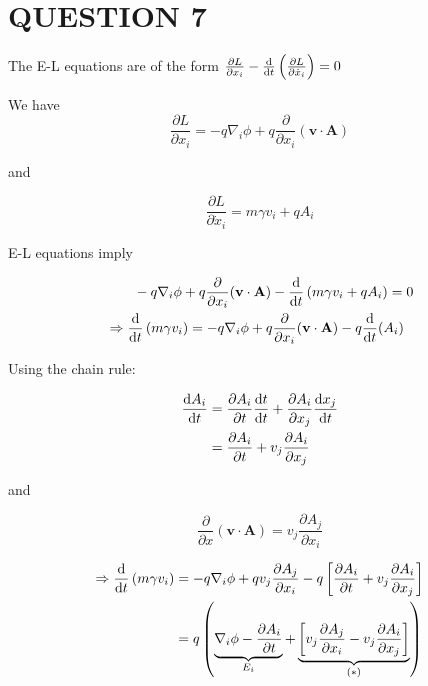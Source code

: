 \documentclass[a4paper]{article}
\begin{document}
\section{QUESTION 7}

The E-L equations are of the form $ \frac{\partial L }{\partial x_{i} } - \frac{\mathrm{d} }{\mathrm{d} t} \left(  \frac{\partial L}{\partial \dot{x}_{i}} \right) = 0 $

We have
\[ \frac{\partial L }{\partial x_{i}} = - q \nabla_{i} \phi + q \frac{\partial }{\partial x_{i}} (\mathbf{v} \cdot \mathbf{A}) \]

and

\[ \frac{\partial L }{\partial \dot{x}_{i}} = m \gamma v_{i} + q A_{i} \]


E-L equations imply

\begin{align*}
& \quad \quad - q \nabla_{i} \phi + q \frac{\partial }{\partial x_{i}} (\mathbf{v} \cdot \mathbf{A}) - \frac{\mathrm{d} }{\mathrm{d} t}  \left(  m \gamma v_{i} + q A_{i} \right) = 0   \\
& \Rightarrow  \frac{\mathrm{d} }{\mathrm{d} t}  \left(  m \gamma v_{i} \right) = - q \nabla_{i} \phi + q \frac{\partial }{\partial x_{i}} (\mathbf{v} \cdot \mathbf{A}) - q \frac{\mathrm{d} }{\mathrm{d} t}( A_{i})
 \end{align*}
 
 
Using the chain rule:
 
\begin{align*}
\frac{\mathrm{d} A_{i}}{\mathrm{d} t} & = \frac{\partial A_{i} }{\partial t} \frac{\mathrm{d} t}{\mathrm{d} t } + \frac{\partial A_{i} }{\partial x_{j}} \frac{\mathrm{d} x_{j}}{\mathrm{d} t} \\
& = \frac{\partial A_{i} }{\partial t} +  v_{j} \frac{\partial A_{i} }{\partial x_{j}} 
\end{align*}

and

\[ \frac{\partial }{\partial x} (\mathbf{v} \cdot \mathbf{A}) = v_{j} \frac{\partial A_{j} }{\partial x_{i}}  \]


\begin{align*}
\Rightarrow  \frac{\mathrm{d} }{\mathrm{d} t}  \left(  m \gamma v_{i} \right) & = - q \nabla_{i} \phi + q v_{j} \frac{\partial A_{j} }{\partial x_{i}} - q \left[  \frac{\partial A_{i} }{\partial t} +  v_{j} \frac{\partial A_{i} }{\partial x_{j}} \right] \\
 & = q \left( \underbrace{\nabla_{i} \phi - \frac{\partial A_{i} }{\partial t}}_{E_{i}}  + \underbrace{\left[ v_{j} \frac{\partial A_{j} }{\partial x_{i}}  -  v_{j} \frac{\partial A_{i} }{\partial x_{j}} \right]}_{(*)}    \right)  
\end{align*}
\end{document}
